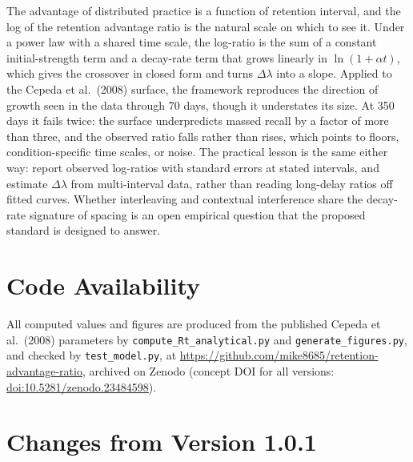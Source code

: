 \documentclass[10pt,twocolumn]{article}
\begin{document}
The advantage of distributed practice is a function of retention interval, and the log of the retention advantage ratio is the natural scale on which to see it. Under a power law with a shared time scale, the log-ratio is the sum of a constant initial-strength term and a decay-rate term that grows linearly in $\ln(1+\alpha t)$, which gives the crossover in closed form and turns $\Delta\lambda$ into a slope. Applied to the Cepeda et al.\ (2008) surface, the framework reproduces the direction of growth seen in the data through 70 days, though it understates its size. At 350 days it fails twice: the surface underpredicts massed recall by a factor of more than three, and the observed ratio falls rather than rises, which points to floors, condition-specific time scales, or noise. The practical lesson is the same either way: report observed log-ratios with standard errors at stated intervals, and estimate $\Delta\lambda$ from multi-interval data, rather than reading long-delay ratios off fitted curves. Whether interleaving and contextual interference share the decay-rate signature of spacing is an open empirical question that the proposed standard is designed to answer.

\section*{Code Availability}

All computed values and figures are produced from the published Cepeda et al.\ (2008) parameters by \texttt{compute\_Rt\_analytical.py} and \texttt{generate\_figures.py}, and checked by \texttt{test\_model.py}, at \url{https://github.com/mike8685/retention-advantage-ratio}, archived on Zenodo (concept DOI for all versions: \href{https://doi.org/10.5281/zenodo.23484598}{doi:10.5281/zenodo.23484598}).

\section*{Changes from Version 1.0.1}
\end{document}
